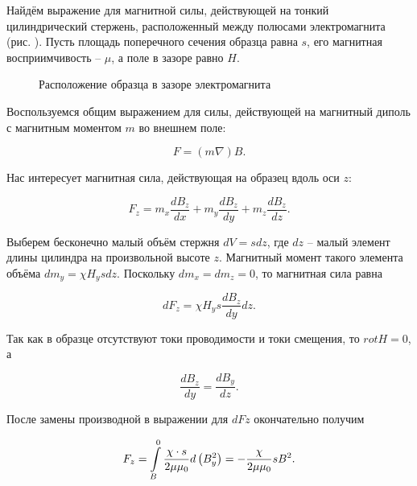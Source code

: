  
Найдём выражение для магнитной силы, действующей на тонкий цилиндрический стержень, расположенный между полюсами электромагнита (рис. ). Пусть площадь поперечного сечения образца равна $s$, его магнитная восприимчивость -- $\mu$, а поле в зазоре равно $H$.


\begin{wrapfigure}{r}{0.4\textwidth}
	\caption{Расположение образца в зазоре электромагнита}
\end{wrapfigure}

Воспользуемся общим выражением для силы, действующей на магнитный диполь с магнитным моментом $m$ во внешнем поле:

\begin{equation*}
	F = (m\nabla)B.
\end{equation*}

Нас интересует магнитная сила, действующая на образец вдоль оси $z$:

\begin{equation*}
	F_z = m_x \frac{dB_z}{dx} + m_y \frac{dB_z}{dy} + m_z \frac{dB_z}{dz}.
\end{equation*}

Выберем бесконечно малый объём стержня $dV = sdz$, где $dz$ -- малый элемент длины цилиндра на произвольной высоте $z$. Магнитный момент такого элемента объёма $dm_y = \chi H_y s dz$. Поскольку $dm_x = dm_z = 0$, то магнитная сила равна

\begin{equation*}
	dF_z = \chi H_y s \frac{dB_z}{dy} dz.
\end{equation*}

Так как в образце отсутствуют токи проводимости и токи смещения, то $rot H = 0$, а

\begin{equation*}
	\frac{dB_z}{dy} = \frac{dB_y}{dz}.
\end{equation*}

После замены производной в выражении для $dFz$ окончательно получим

\begin{equation}
	\eqmark[magnetic force-z]
	F_z = \int\limits_B^0 \frac{\chi\cdot s}{2\mu \mu_0}d\left( B_y^2 \right) = - \frac{\chi}{2\mu \mu_0} sB^2.
\end{equation}

